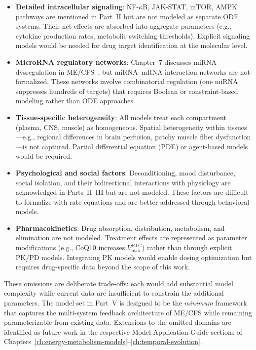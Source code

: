 \begin{itemize}
    \item \textbf{Detailed intracellular signaling}: NF-$\kappa$B, JAK-STAT, mTOR, AMPK pathways are mentioned in Part~II but are not modeled as separate ODE systems. Their net effects are absorbed into aggregate parameters (e.g., cytokine production rates, metabolic switching thresholds). Explicit signaling models would be needed for drug target identification at the molecular level.
    \item \textbf{MicroRNA regulatory networks}: Chapter~7 discusses miRNA dysregulation in ME/CFS~\cite{Cheema2023mirna}, but miRNA--mRNA interaction networks are not formalized. These networks involve combinatorial regulation (one miRNA suppresses hundreds of targets) that requires Boolean or constraint-based modeling rather than ODE approaches.
    \item \textbf{Tissue-specific heterogeneity}: All models treat each compartment (plasma, CNS, muscle) as homogeneous. Spatial heterogeneity within tissues---e.g., regional differences in brain perfusion, patchy muscle fiber dysfunction---is not captured. Partial differential equation (PDE) or agent-based models would be required.
    \item \textbf{Psychological and social factors}: Deconditioning, mood disturbance, social isolation, and their bidirectional interactions with physiology are acknowledged in Parts~II--III but are not modeled. These factors are difficult to formalize with rate equations and are better addressed through behavioral models.
    \item \textbf{Pharmacokinetics}: Drug absorption, distribution, metabolism, and elimination are not modeled. Treatment effects are represented as parameter modifications (e.g., CoQ10 increases $V_{\max}^{\text{ETC}}$) rather than through explicit PK/PD models. Integrating PK models would enable dosing optimization but requires drug-specific data beyond the scope of this work.
\end{itemize}


These omissions are deliberate trade-offs: each would add substantial model complexity while current data are insufficient to constrain the additional parameters. The model set in Part~V is designed to be the \emph{minimum} framework that captures the multi-system feedback architecture of ME/CFS while remaining parameterizable from existing data. Extensions to the omitted domains are identified as future work in the respective Model Application Guide sections of Chapters~\ref{ch:energy-metabolism-models}--\ref{ch:temporal-evolution}.

